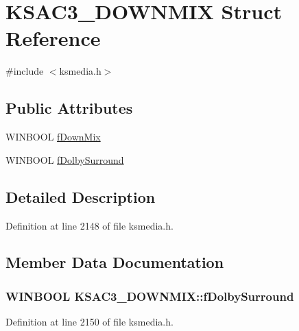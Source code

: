 \hypertarget{struct_k_s_a_c3___d_o_w_n_m_i_x}{}\section{K\+S\+A\+C3\+\_\+\+D\+O\+W\+N\+M\+IX Struct Reference}
\label{struct_k_s_a_c3___d_o_w_n_m_i_x}


{\ttfamily \#include $<$ksmedia.\+h$>$}

\subsection*{Public Attributes}
\begin{DoxyCompactItemize}
\item 
W\+I\+N\+B\+O\+OL \hyperlink{struct_k_s_a_c3___d_o_w_n_m_i_x_a84ced7595ea6d3e4d207bdf5a96614f1}{f\+Down\+Mix}
\item 
W\+I\+N\+B\+O\+OL \hyperlink{struct_k_s_a_c3___d_o_w_n_m_i_x_acaca8c825d8097c0d32d47081bd7b9fd}{f\+Dolby\+Surround}
\end{DoxyCompactItemize}


\subsection{Detailed Description}


Definition at line 2148 of file ksmedia.\+h.



\subsection{Member Data Documentation}
\subsubsection[{\texorpdfstring{f\+Dolby\+Surround}{fDolbySurround}}]{\setlength{\rightskip}{0pt plus 5cm}W\+I\+N\+B\+O\+OL K\+S\+A\+C3\+\_\+\+D\+O\+W\+N\+M\+I\+X\+::f\+Dolby\+Surround}\hypertarget{struct_k_s_a_c3___d_o_w_n_m_i_x_acaca8c825d8097c0d32d47081bd7b9fd}{}\label{struct_k_s_a_c3___d_o_w_n_m_i_x_acaca8c825d8097c0d32d47081bd7b9fd}


Definition at line 2150 of file ksmedia.\+h.

